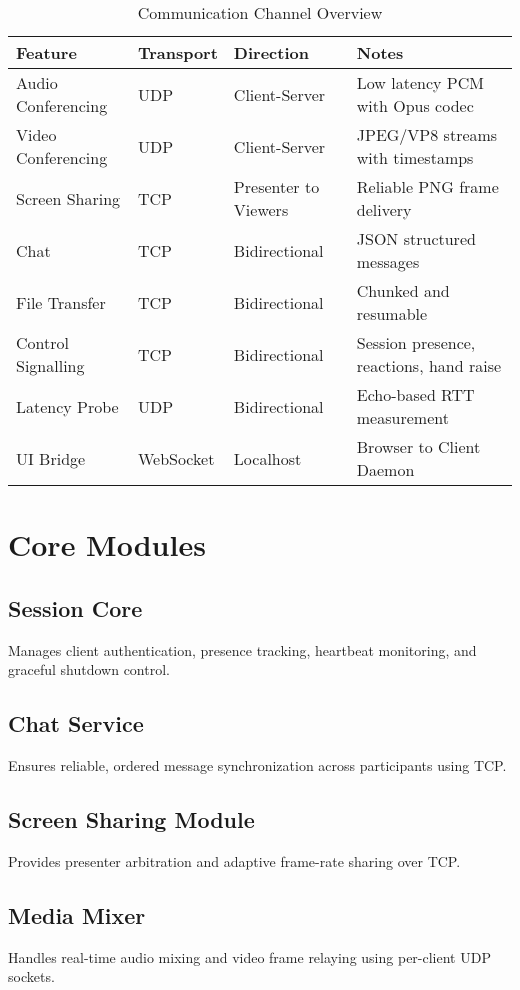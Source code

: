 \documentclass[conference]{IEEEtran}
\begin{document}
\begin{table}[h]
\centering
\caption{Communication Channel Overview}
\label{table:channels}
\begin{tabular}{|p{2.2cm}|p{1.2cm}|p{2cm}|p{2cm}|}
\hline
\textbf{Feature} & \textbf{Transport} & \textbf{Direction} & \textbf{Notes} \\
\hline
Audio Conferencing & UDP & Client-Server & Low latency PCM with Opus codec \\
\hline
Video Conferencing & UDP & Client-Server & JPEG/VP8 streams with timestamps \\
\hline
Screen Sharing & TCP & Presenter to Viewers & Reliable PNG frame delivery \\
\hline
Chat & TCP & Bidirectional & JSON structured messages \\
\hline
File Transfer & TCP & Bidirectional & Chunked and resumable \\
\hline
Control Signalling & TCP & Bidirectional & Session presence, reactions, hand raise \\
\hline
Latency Probe & UDP & Bidirectional & Echo-based RTT measurement \\
\hline
UI Bridge & WebSocket & Localhost & Browser to Client Daemon \\
\hline
\end{tabular}
\end{table}

\section{Core Modules}
\subsection{Session Core}
Manages client authentication, presence tracking, heartbeat monitoring, and graceful shutdown control.

\subsection{Chat Service}
Ensures reliable, ordered message synchronization across participants using TCP.

\subsection{Screen Sharing Module}
Provides presenter arbitration and adaptive frame-rate sharing over TCP.

\subsection{Media Mixer}
Handles real-time audio mixing and video frame relaying using per-client UDP sockets.
\end{document}
